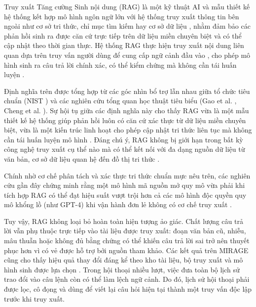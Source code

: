 \begin{definition}
\label{def:rag}
Truy xuất Tăng cường Sinh nội dung (RAG) là một kỹ thuật AI và mẫu thiết kế hệ thống kết hợp mô hình ngôn ngữ lớn với hệ thống truy xuất thông tin bên ngoài như cơ sở tri thức, chỉ mục tìm kiếm hay cơ sở dữ liệu \cite{nist_ai_100_2e2025, cheng2025knowledge}, nhằm đảm bảo các phản hồi sinh ra được căn cứ trực tiếp trên dữ liệu miền chuyên biệt và có thể cập nhật theo thời gian thực. Hệ thống RAG thực hiện truy xuất nội dung liên quan dựa trên truy vấn người dùng \cite{nist_ai_100_2e2025} để cung cấp ngữ cảnh đầu vào \cite{gao2023}, cho phép mô hình sinh ra câu trả lời chính xác, có thể kiểm chứng mà không cần tái huấn luyện \cite{nist_ai_100_2e2025}.
\end{definition}


\noindent Định nghĩa trên được tổng hợp từ các góc nhìn bổ trợ lẫn nhau giữa tổ chức tiêu chuẩn (NIST \cite{nist_ai_100_2e2025}) và các nghiên cứu tổng quan học thuật tiêu biểu (Gao et al. \cite{gao2023}, Cheng et al. \cite{cheng2025knowledge}). Sự hội tụ giữa các định nghĩa này cho thấy RAG vừa là một mẫu thiết kế hệ thống giúp phản hồi luôn có căn cứ xác thực từ dữ liệu miền chuyên biệt, vừa là một kiến trúc linh hoạt cho phép cập nhật tri thức liên tục mà không cần tái huấn luyện mô hình \cite{nist_ai_100_2e2025, gao2023}. Đáng chú ý, RAG không bị giới hạn trong bất kỳ công nghệ truy xuất cụ thể nào mà có thể kết nối với đa dạng nguồn dữ liệu từ văn bản, cơ sở dữ liệu quan hệ đến đồ thị tri thức \cite{cheng2025knowledge}.


Chính nhờ cơ chế phân tách và xác thực tri thức chuẩn mực nêu trên, các nghiên cứu gần đây chứng minh rằng một mô hình mã nguồn mở quy mô vừa phải khi tích hợp RAG có thể đạt hiệu suất vượt trội hơn cả các mô hình độc quyền quy mô khổng lồ (như GPT-4) khi vận hành đơn lẻ không có cơ chế truy xuất \cite{medrag2024, gao2023}.

Tuy vậy, RAG không loại bỏ hoàn toàn hiện tượng ảo giác. Chất lượng câu trả lời vẫn phụ thuộc trực tiếp vào tài liệu được truy xuất: đoạn văn bản cũ, nhiễu, mâu thuẫn hoặc không đủ bằng chứng có thể khiến câu trả lời sai trở nên thuyết phục hơn vì có vẻ được hỗ trợ bởi nguồn tham khảo. Các kết quả trên MIRAGE cũng cho thấy hiệu quả thay đổi đáng kể theo kho tài liệu, bộ truy xuất và mô hình sinh được lựa chọn \cite{xiong2024mirage}. Trong hội thoại nhiều lượt, việc đưa toàn bộ lịch sử trao đổi vào câu lệnh còn có thể làm lệch ngữ cảnh. Do đó, lịch sử hội thoại phải được lọc, cô đọng và dùng để viết lại câu hỏi hiện tại thành một truy vấn độc lập trước khi truy xuất.

